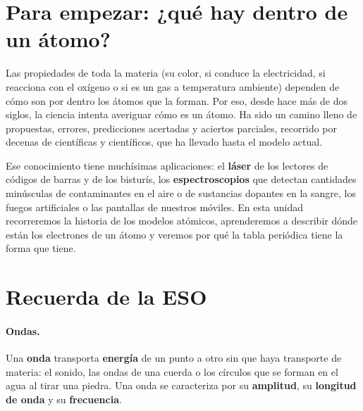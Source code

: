 
\section*{Para empezar: ¿qué hay dentro de un átomo?}

Las propiedades de toda la materia (su color, si conduce la electricidad, si reacciona con el oxígeno o si es un gas a
temperatura ambiente) dependen de cómo son por dentro los átomos que la forman. Por eso, desde hace más de dos siglos, la
ciencia intenta averiguar cómo es un átomo. Ha sido un camino lleno de propuestas, errores, predicciones acertadas y aciertos
parciales, recorrido por decenas de científicas y científicos, que ha llevado hasta el modelo actual.

Ese conocimiento tiene muchísimas aplicaciones: el \textbf{láser} de los lectores de códigos de barras y de los bisturís, los
\textbf{espectroscopios} que detectan cantidades minúsculas de contaminantes en el aire o de sustancias dopantes en la sangre,
los fuegos artificiales o las pantallas de nuestros móviles. En esta unidad recorreremos la historia de los modelos atómicos,
aprenderemos a describir dónde están los electrones de un átomo y veremos por qué la tabla periódica tiene la forma que tiene.

\section{Recuerda de la ESO}\label{sec:ud3-eso}

\paragraph{Ondas.} Una \textbf{onda} transporta \textbf{energía} de un punto a otro sin que haya transporte de materia: el
sonido, las ondas de una cuerda o los círculos que se forman en el agua al tirar una piedra. Una onda se caracteriza por su
\textbf{amplitud}, su \textbf{longitud de onda} y su \textbf{frecuencia}.

